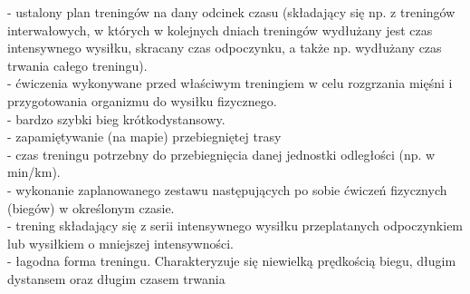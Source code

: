 	\hspace{10 mm} - ustalony plan treningów na dany odcinek czasu (składający się np. z treningów interwałowych, w których w kolejnych dniach treningów wydłużany jest czas intensywnego wysiłku, skracany czas odpoczynku, a także np. wydłużany czas trwania całego treningu).\\
	\hspace{10 mm} - ćwiczenia wykonywane przed właściwym treningiem w celu rozgrzania mięśni i przygotowania organizmu do wysiłku fizycznego.\\
	\hspace{10 mm} - bardzo szybki bieg krótkodystansowy.\\
	\hspace{10 mm} - zapamiętywanie (na mapie) przebiegniętej trasy\\
	\hspace{10 mm} - czas treningu potrzebny do przebiegnięcia danej jednostki odległości (np. w min/km).\\
	\hspace{10 mm} - wykonanie zaplanowanego zestawu następujących po sobie ćwiczeń fizycznych (biegów) w określonym czasie. \\
	\hspace{10 mm} - trening składający się z serii intensywnego wysiłku przeplatanych odpoczynkiem lub wysiłkiem o mniejszej intensywności.\\
	\hspace{10 mm} - łagodna forma treningu. Charakteryzuje się niewielką prędkością biegu, długim dystansem oraz długim czasem trwania\\